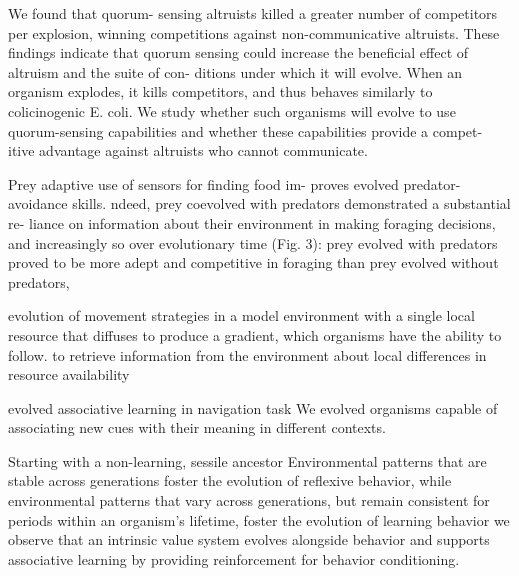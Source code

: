 \citep{johnson_more_2014}
We found that quorum- sensing altruists killed a greater number of competitors per explosion, winning competitions against non-communicative altruists. These findings indicate that quorum sensing could increase the beneficial effect of altruism and the suite of con- ditions under which it will evolve.
When an organism explodes, it kills competitors, and thus behaves similarly to colicinogenic E. coli. We study whether such organisms will evolve to use quorum-sensing capabilities and whether these capabilities provide a compet- itive advantage against altruists who cannot communicate.


\citep{wagner_behavioral_2014}
 Prey adaptive use of sensors for finding food im- proves evolved predator-avoidance skills.
 ndeed, prey coevolved with predators demonstrated a substantial re- liance on information about their environment in making foraging decisions, and increasingly so over evolutionary time (Fig. 3):
prey evolved with predators proved to be more adept and competitive in foraging than prey evolved without predators, 

\citep{elsberry_cockroaches_2009}
evolution of movement strategies in a model environment with a single local resource that diffuses to produce a gradient, which organisms have the ability to follow.
 to retrieve information from the environment about local differences in resource availability
 
 
\citep{pontes_investigations_2017}
evolved associative learning in navigation task
We evolved organisms capable of associating new cues with their meaning in different contexts.

\citep{pontes_evolutionary_2019}
Starting with a non-learning, sessile ancestor
Environmental patterns that are stable across generations foster the evolution of reflexive behavior, while environmental patterns that vary across generations, but remain consistent for periods within an organism’s lifetime, foster the evolution of learning behavior
we observe that an intrinsic value system evolves alongside behavior and supports associative learning by providing reinforcement for behavior conditioning.

